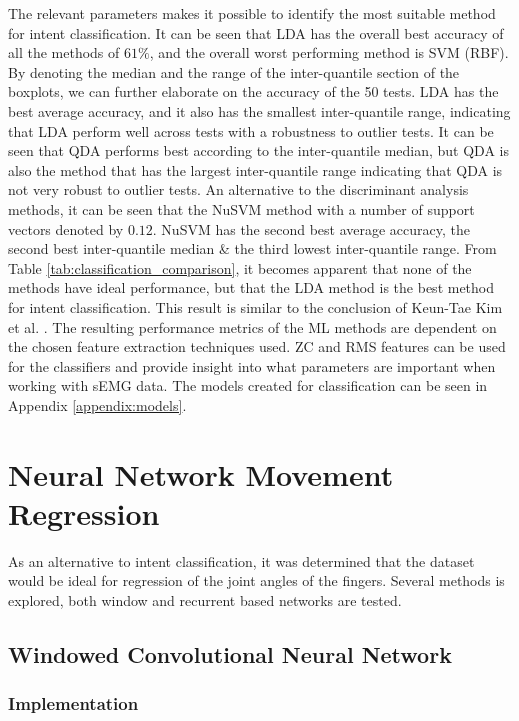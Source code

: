 \documentclass[../main.tex]{subfiles}
\begin{document}
The relevant parameters makes it possible to identify the most suitable method for intent classification.
It can be seen that LDA has the overall best accuracy of all the methods of $61\%$, and the overall worst performing method is SVM (RBF).
By denoting the median and the range of the inter-quantile section of the boxplots, we can further elaborate on the accuracy of the 50 tests.
LDA has the best average accuracy, and it also has the smallest inter-quantile range, indicating that LDA perform well across tests with a robustness to outlier tests. 
It can be seen that QDA performs best according to the inter-quantile median, but QDA is also the method that has the largest inter-quantile range indicating that QDA is not very robust to outlier tests.
An alternative to the discriminant analysis methods, it can be seen that the NuSVM method with a number of support vectors denoted by $0.12$.
NuSVM has the second best average accuracy, the second best inter-quantile median \& the third lowest inter-quantile range.
From Table \ref{tab:classification_comparison}, it becomes apparent that none of the methods have ideal performance, but that the LDA method is the best method for intent classification.
This result is similar to the conclusion of Keun-Tae Kim et al. \cite{KeunTaeKim2021}.
The resulting performance metrics of the ML methods are dependent on the chosen feature extraction techniques used.
\gls{ZC} and \gls{RMS} features can be used for the classifiers and provide insight into what parameters are important when working with sEMG data.
The models created for classification can be seen in Appendix \ref{appendix:models}.

\section{Neural Network Movement Regression}
\label{sec:regression}

As an alternative to intent classification, it was determined that the dataset would be ideal for regression of the joint angles of the fingers.
Several methods is explored, both window and recurrent based networks are tested.


\subsection{Windowed Convolutional Neural Network}

\subsubsection{Implementation}
\end{document}

